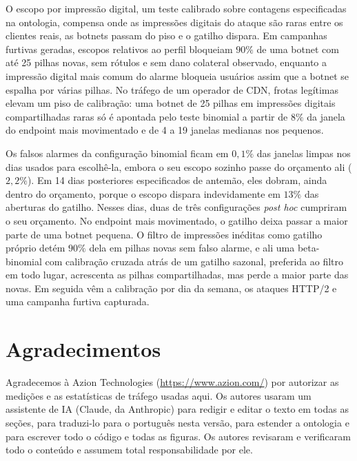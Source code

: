 \documentclass[conference,letterpaper,10pt]{IEEEtran}
\newcommand\1{\textit{(i)}}
\newcommand\2{\textit{(ii)}}
\newcommand\3{\textit{(iii)}}
\begin{document}
O escopo por impressão digital, um teste calibrado sobre contagens especificadas na ontologia, compensa onde as impressões digitais do ataque são raras entre os clientes reais, as botnets passam do piso e o gatilho dispara. Em campanhas furtivas geradas, escopos relativos ao perfil bloqueiam $90\%$ de uma botnet com até 25 pilhas novas, sem rótulos e sem dano colateral observado, enquanto a impressão digital mais comum do alarme bloqueia usuários assim que a botnet se espalha por várias pilhas. No tráfego de um operador de CDN, frotas legítimas elevam um piso de calibração: uma botnet de 25 pilhas em impressões digitais compartilhadas raras só é apontada pelo teste binomial a partir de $8\%$ da janela do endpoint mais movimentado e de 4 a 19 janelas medianas nos pequenos.

Os falsos alarmes da configuração binomial ficam em $0{,}1\%$ das janelas limpas nos dias usados para escolhê-la, embora o seu escopo sozinho passe do orçamento ali ($2{,}2\%$). Em 14 dias posteriores especificados de antemão, eles dobram, ainda dentro do orçamento, porque o escopo dispara indevidamente em $13\%$ das aberturas do gatilho. Nesses dias, duas de três configurações \textit{post hoc} cumpriram o seu orçamento. No endpoint mais movimentado, o gatilho deixa passar a maior parte de uma botnet pequena. O filtro de impressões inéditas como gatilho próprio detém $90\%$ dela em pilhas novas sem falso alarme, e ali uma beta-binomial com calibração cruzada atrás de um gatilho sazonal, preferida ao filtro em todo lugar, acrescenta as pilhas compartilhadas, mas perde a maior parte das novas. Em seguida vêm a calibração por dia da semana, os ataques HTTP/2 e uma campanha furtiva capturada.

\section*{Agradecimentos}
Agradecemos à Azion Technologies (\url{https://www.azion.com/}) por autorizar as medições e as estatísticas de tráfego usadas aqui. Os autores usaram um assistente de IA (Claude, da Anthropic) para redigir e editar o texto em todas as seções, para traduzi-lo para o português nesta versão, para estender a ontologia e para escrever todo o código e todas as figuras. Os autores revisaram e verificaram todo o conteúdo e assumem total responsabilidade por ele.




\appendices
\end{document}

